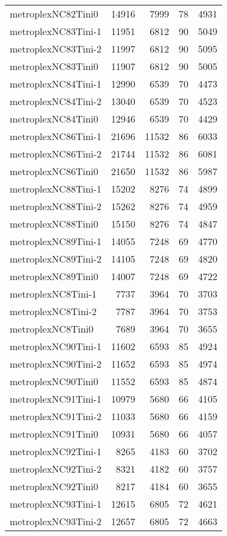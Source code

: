\begin{longtable}{lrrrr}
metroplexNC82Tini0 & 14916 & 7999 & 78 & 4931 \\
metroplexNC83Tini-1 & 11951 & 6812 & 90 & 5049 \\
metroplexNC83Tini-2 & 11997 & 6812 & 90 & 5095 \\
metroplexNC83Tini0 & 11907 & 6812 & 90 & 5005 \\
metroplexNC84Tini-1 & 12990 & 6539 & 70 & 4473 \\
metroplexNC84Tini-2 & 13040 & 6539 & 70 & 4523 \\
metroplexNC84Tini0 & 12946 & 6539 & 70 & 4429 \\
metroplexNC86Tini-1 & 21696 & 11532 & 86 & 6033 \\
metroplexNC86Tini-2 & 21744 & 11532 & 86 & 6081 \\
metroplexNC86Tini0 & 21650 & 11532 & 86 & 5987 \\
metroplexNC88Tini-1 & 15202 & 8276 & 74 & 4899 \\
metroplexNC88Tini-2 & 15262 & 8276 & 74 & 4959 \\
metroplexNC88Tini0 & 15150 & 8276 & 74 & 4847 \\
metroplexNC89Tini-1 & 14055 & 7248 & 69 & 4770 \\
metroplexNC89Tini-2 & 14105 & 7248 & 69 & 4820 \\
metroplexNC89Tini0 & 14007 & 7248 & 69 & 4722 \\
metroplexNC8Tini-1 & 7737 & 3964 & 70 & 3703 \\
metroplexNC8Tini-2 & 7787 & 3964 & 70 & 3753 \\
metroplexNC8Tini0 & 7689 & 3964 & 70 & 3655 \\
metroplexNC90Tini-1 & 11602 & 6593 & 85 & 4924 \\
metroplexNC90Tini-2 & 11652 & 6593 & 85 & 4974 \\
metroplexNC90Tini0 & 11552 & 6593 & 85 & 4874 \\
metroplexNC91Tini-1 & 10979 & 5680 & 66 & 4105 \\
metroplexNC91Tini-2 & 11033 & 5680 & 66 & 4159 \\
metroplexNC91Tini0 & 10931 & 5680 & 66 & 4057 \\
metroplexNC92Tini-1 & 8265 & 4183 & 60 & 3702 \\
metroplexNC92Tini-2 & 8321 & 4182 & 60 & 3757 \\
metroplexNC92Tini0 & 8217 & 4184 & 60 & 3655 \\
metroplexNC93Tini-1 & 12615 & 6805 & 72 & 4621 \\
metroplexNC93Tini-2 & 12657 & 6805 & 72 & 4663 \\

\end{longtable}
